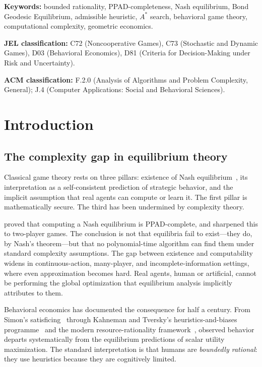 \documentclass[11pt]{article}
\theoremstyle{definition}
\theoremstyle{remark}
\begin{document}
\medskip
\noindent\textbf{Keywords:} bounded rationality, PPAD-completeness, Nash equilibrium, Bond Geodesic
Equilibrium, admissible heuristic, $A^*$ search, behavioral game theory, computational complexity,
geometric economics.

\medskip
\noindent\textbf{JEL classification:} C72 (Noncooperative Games), C73 (Stochastic and Dynamic Games),
D03 (Behavioral Economics), D81 (Criteria for Decision-Making under Risk and Uncertainty).

\noindent\textbf{ACM classification:} F.2.0 (Analysis of Algorithms and Problem Complexity, General);
J.4 (Computer Applications: Social and Behavioral Sciences).


\section{Introduction}
\label{sec:intro}

\subsection{The complexity gap in equilibrium theory}

Classical game theory rests on three pillars: existence of Nash equilibrium~\cite{nash1950}, its
interpretation as a self-consistent prediction of strategic behavior, and the implicit assumption
that real agents can compute or learn it. The first pillar is mathematically secure. The third has
been undermined by complexity theory.

\cite{daskalakis2009} proved that computing a Nash equilibrium is \textsc{PPAD}-complete, and
\cite{chen2009} sharpened this to two-player games. The conclusion is not that equilibria fail to
exist---they do, by Nash's theorem---but that no polynomial-time algorithm can find them under
standard complexity assumptions. The gap between existence and computability widens in continuous-action,
many-player, and incomplete-information settings, where even approximation becomes hard. Real agents,
human or artificial, cannot be performing the global optimization that equilibrium analysis
implicitly attributes to them.

Behavioral economics has documented the consequence for half a century. From Simon's
satisficing~\cite{simon1955} through Kahneman and Tversky's heuristics-and-biases
programme~\cite{kahneman1979,tversky1992} and the modern resource-rationality
framework~\cite{lieder2020}, observed behavior departs systematically from the equilibrium
predictions of scalar utility maximization. The standard interpretation is that humans are
\emph{boundedly rational}: they use heuristics because they are cognitively limited.
\end{document}
